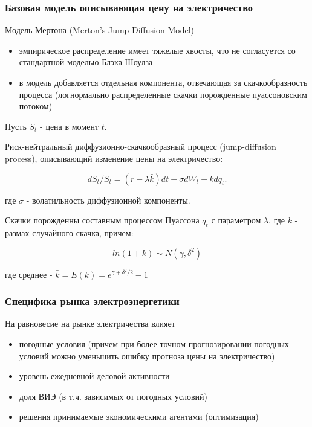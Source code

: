 \documentclass[c, dvipsnames]{beamer}  %
\begin{document}
\begin{frame}[shrink=5]
\frametitle{Базовая модель описывающая цену на электричество} 


Модель Мертона (Merton’s Jump-Diffusion Model)

\begin{itemize}
	\item эмпирическое распределение имеет тяжелые хвосты, что не согласуется со стандартной моделью Блэка-Шоулза
	\item  в модель добавляется отдельная компонента, отвечающая за скачкообразность процесса (логнормально распределенные скачки порожденные пуассоновским потоком)    
\end{itemize}

Пусть $S_t$ - цена в момент $t$.

Риск-нейтральный диффузионно-скачкообразный процесс (jump-diffusion process), описывающий изменение цены на электричество:

$$dS_t/S_t=(r−\lambda \bar{k})dt+\sigma dW_t+kdq_t.$$

где $\sigma$ - волатильность диффузионной компоненты. 

Скачки порожденны составным процессом Пуассона  $q_t$  с параметром  $\lambda$, где $k$  - размах случайного скачка, причем:

$$ln(1 +k)\sim N(\gamma,\delta^2)$$

где среднее - $\bar{k} = E(k)=e^{\gamma + \delta^2/2}-1$



\end{frame}





\begin{frame}[shrink=5]
\frametitle{Специфика рынка электроэнергетики} 

На равновесие на рынке  электричества влияет 

\begin{itemize}
	\item  погодные условия (причем при более точном прогнозировании погодных условий можно уменьшить ошибку прогноза цены на электричество)
	\item  уровень ежедневной деловой активности 
	\item  доля ВИЭ (в т.ч. зависимых от погодных условий) 
	\item  решения принимаемые  экономическими агентами (оптимизация)
\end{itemize}

\end{frame}
\end{document}
